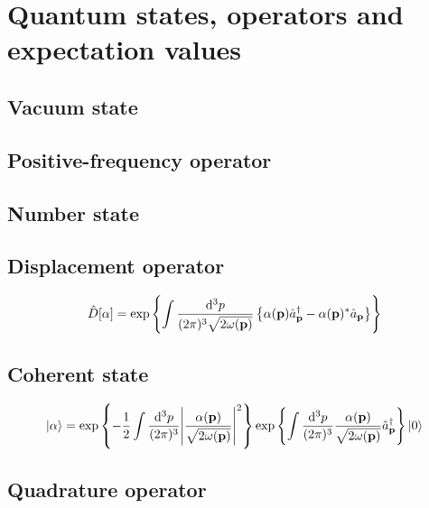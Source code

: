 \section{Quantum states, operators and expectation values}

\subsection{Vacuum state}

\subsection{Positive-frequency operator}

\subsection{Number state}

\subsection{Displacement operator}

\begin{equation}
	\hat{D}[\alpha]
	=
	\exp\left\{
		\int\frac{\dd[3]{p}}{(2\pi)^3\sqrt{2\omega(\vb{p})}}
		\left\{
			\alpha(\vb{p})
			\hat{a}_{\vb{p}}^\dagger
			-
			\alpha(\vb{p})^*
			\hat{a}_{\vb{p}}
		\right\}
	\right\}
\end{equation}

\subsection{Coherent state}

\begin{equation}
	\ket{\alpha}
	=
	\exp\left\{
		-
		\frac{1}{2}
		\int\frac{\dd[3]{p}}{(2\pi)^3}
		\abs{\frac{\alpha(\vb{p})}{\sqrt{2\omega(\vb{p})}}}^2
	\right\}
	\exp\left\{
		\int\frac{\dd[3]{p}}{(2\pi)^3}
		\frac{\alpha(\vb{p})}{\sqrt{2\omega(\vb{p})}}
		\hat{a}_{\vb{p}}^\dagger
	\right\}
	\ket{0}
\end{equation}

\subsection{Quadrature operator}

